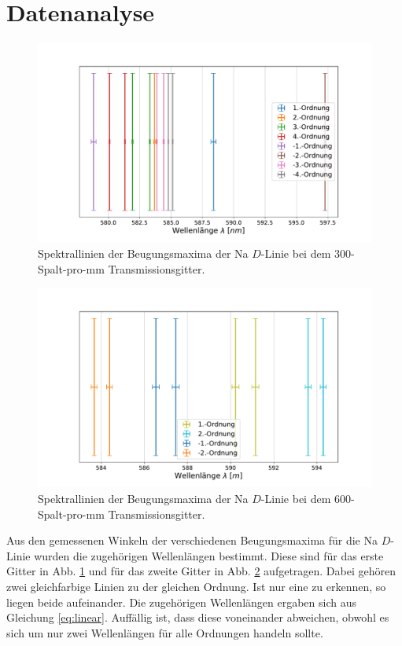 \section{Datenanalyse} \label{sec:Analyse}
	
	\begin{figure}[ht]
		\centering
		\includegraphics[width=\textwidth]{data/Gitter300.pdf}
		\caption{Spektrallinien der Beugungsmaxima der Na $D$-Linie bei dem 300-Spalt-pro-\si{\milli\meter} Transmissionsgitter.}
		\label{fig:Gitter300}	
	\end{figure}
	\begin{figure}[ht]
		\centering
		\includegraphics[width=\textwidth]{data/Gitter600.pdf}
		\caption{Spektrallinien der Beugungsmaxima der Na $D$-Linie bei dem 600-Spalt-pro-\si{\milli\meter} Transmissionsgitter.}
		\label{fig:Gitter600}	
	\end{figure}
	Aus den gemessenen Winkeln der verschiedenen Beugungsmaxima für die Na $D$-Linie wurden die zugehörigen Wellenlängen bestimmt.
	Diese sind für das erste Gitter in Abb. \ref{fig:Gitter300} und für das zweite Gitter in Abb. \ref{fig:Gitter600} aufgetragen.
	Dabei gehören zwei gleichfarbige Linien zu der gleichen Ordnung.
	Ist nur eine zu erkennen, so liegen beide aufeinander.
	Die zugehörigen Wellenlängen ergaben sich aus Gleichung \ref{eq:linear}.
	Auffällig ist, dass diese voneinander abweichen, obwohl es sich um nur zwei Wellenlängen für alle Ordnungen handeln sollte.
	
